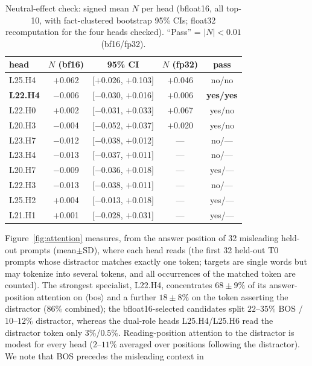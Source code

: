 \documentclass[paper]{ieice}
\newcommand{\spec}{L22.H4}
\begin{document}
\begin{table}[t]
\caption{Neutral-effect check: signed mean $N$ per head (bfloat16,
all top-10, with fact-clustered bootstrap 95\% CIs; float32
recomputation for the four heads checked). ``Pass'' = $|N|<0.01$
(bf16/fp32).}
\label{tab:neutral}
\begin{center}
\begin{tabular}{lcccc}
\toprule
head & $N$ (bf16) & 95\% CI & $N$ (fp32) & pass \\
\midrule
L25.H4 & $+$0.062 & $[+$0.026, $+$0.103$]$ & $+$0.046 & no/no \\
\textbf{L22.H4} & $-$0.006 & $[-$0.030, $+$0.016$]$ & $+$0.006 & \textbf{yes/yes} \\
L22.H0 & $+$0.002 & $[-$0.031, $+$0.033$]$ & $+$0.067 & yes/no \\
L20.H3 & $-$0.004 & $[-$0.052, $+$0.037$]$ & $+$0.020 & yes/no \\
L23.H7 & $-$0.012 & $[-$0.038, $+$0.012$]$ & --- & no/--- \\
L23.H4 & $-$0.013 & $[-$0.037, $+$0.011$]$ & --- & no/--- \\
L20.H7 & $-$0.009 & $[-$0.036, $+$0.018$]$ & --- & yes/--- \\
L22.H3 & $-$0.013 & $[-$0.038, $+$0.011$]$ & --- & no/--- \\
L25.H2 & $+$0.004 & $[-$0.013, $+$0.018$]$ & --- & yes/--- \\
L21.H1 & $+$0.001 & $[-$0.028, $+$0.031$]$ & --- & yes/--- \\
\bottomrule
\end{tabular}
\end{center}
\end{table}
 Figure~\ref{fig:attention} measures, from the answer position of
32 misleading held-out prompts (mean$\pm$SD), where each head reads
(the first 32 held-out T0 prompts whose distractor matches exactly
one token; targets are single words but may tokenize into several
tokens, and all occurrences of the matched token are counted).
The strongest specialist, \spec{}, concentrates $68\pm9\%$ of its
answer-position attention on $\langle$bos$\rangle$ and a further
$18\pm8\%$ on the token asserting the distractor ($86\%$ combined);
the bfloat16-selected candidates split $22$--$35\%$ BOS / $10$--$12\%$
distractor,
whereas the dual-role heads L25.H4/L25.H6 read the distractor token
only $3\%$/$0.5\%$. Reading-position attention to the distractor is
modest for every head ($2$--$11\%$ averaged over positions following
the distractor). We note that BOS precedes the misleading context in
\end{document}
